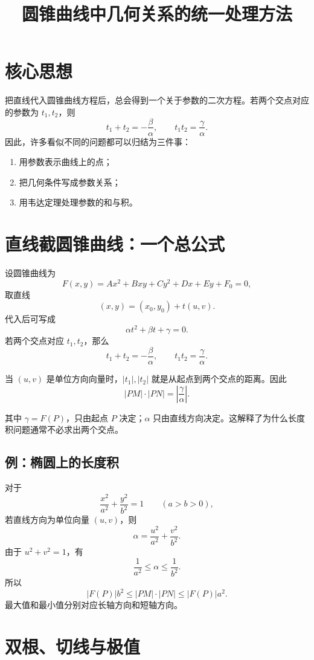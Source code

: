\documentclass[11pt,a4paper]{ctexart}
\title{圆锥曲线中几何关系的统一处理方法}
\author{}
\date{}
\begin{document}
\maketitle

\section{核心思想}

把直线代入圆锥曲线方程后，总会得到一个关于参数的二次方程。若两个交点对应的参数为 $t_1,t_2$，则
\[
t_1+t_2=-\frac{\beta}{\alpha},\qquad
t_1t_2=\frac{\gamma}{\alpha}.
\]
因此，许多看似不同的问题都可以归结为三件事：
\begin{enumerate}
  \item 用参数表示曲线上的点；
  \item 把几何条件写成参数关系；
  \item 用韦达定理处理参数的和与积。
\end{enumerate}

\section{直线截圆锥曲线：一个总公式}

设圆锥曲线为
\[
F(x,y)=Ax^2+Bxy+Cy^2+Dx+Ey+F_0=0,
\]
取直线
\[
(x,y)=(x_0,y_0)+t(u,v).
\]
代入后可写成
\[
\alpha t^2+\beta t+\gamma=0.
\]
若两个交点对应 $t_1,t_2$，那么
\[
t_1+t_2=-\frac{\beta}{\alpha},\qquad
t_1t_2=\frac{\gamma}{\alpha}.
\]

当 $(u,v)$ 是单位方向向量时，$|t_1|,|t_2|$ 就是从起点到两个交点的距离。因此
\[
\boxed{|PM|\cdot|PN|=\left|\frac{\gamma}{\alpha}\right|}.
\]

其中 $\gamma=F(P)$，只由起点 $P$ 决定；$\alpha$ 只由直线方向决定。这解释了为什么长度积问题通常不必求出两个交点。

\subsection*{例：椭圆上的长度积}

对于
\[
\frac{x^2}{a^2}+\frac{y^2}{b^2}=1\qquad(a>b>0),
\]
若直线方向为单位向量 $(u,v)$，则
\[
\alpha=\frac{u^2}{a^2}+\frac{v^2}{b^2}.
\]
由于 $u^2+v^2=1$，有
\[
\frac1{a^2}\leq \alpha\leq\frac1{b^2}.
\]
所以
\[
|F(P)|b^2\leq |PM|\cdot|PN|\leq |F(P)|a^2.
\]
最大值和最小值分别对应长轴方向和短轴方向。

\section{双根、切线与极值}
\end{document}
